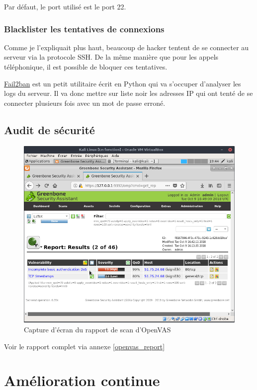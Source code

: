 \documentclass[]{report}
\begin{document}
      Par défaut, le port utilisé est le port 22.

    \subsection{Blacklister les tentatives de connexions}

      Comme je l'expliquait plus haut, beaucoup de hacker tentent de se connecter au serveur via la protocole SSH. De la même manière que pour les appels téléphonique, il est possible de bloquer ces tentatives.

       \href{https://www.fail2ban.org/wiki/index.php/Main_Page}{Fail2ban} est un petit utilitaire écrit en Python qui va s’occuper d'analyser les logs du serveur. Il va donc mettre sur liste noir les adresses IP qui ont tenté de se connecter plusieurs fois avec un mot de passe erroné.


  \section{Audit de sécurité}

    \begin{figure}[h!]
      \includegraphics[width=\linewidth]{img/kali_openvas_report.png}
      \caption{Capture d'écran du rapport de scan d'OpenVAS}
    \end{figure}

    Voir le rapport complet via annexe \ref{openvas_report}


\chapter{Amélioration continue}
\end{document}
